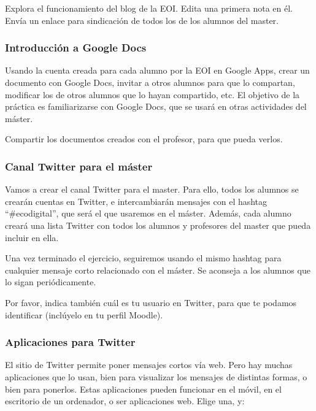 \documentclass[a4paper,12pt]{article}
\begin{document}
Explora el funcionamiento del blog de la EOI. Edita una primera nota en él. Envía un enlace para sindicación de todos los de los alumnos del master.

\subsubsection{Introducción a Google Docs}
\label{sub:googledocs}

Usando la cuenta creada para cada alumno por la EOI en Google Apps, crear un documento con Google Docs, invitar a otros alumnos para que lo compartan, modificar los de otros alumnos que lo hayan compartido, etc. El objetivo de la práctica es familiarizarse con Google Docs, que se usará en otras actividades del máster.

Compartir los documentos creados con el profesor, para que pueda verlos.

\subsubsection{Canal Twitter para el máster}
\label{sub:canaltwitter}

Vamos a crear el canal Twitter para el master. Para ello, todos los alumnos se crearán cuentas en Twitter, e intercambiarán mensajes con el hashtag ``\#ecodigital'', que será el que usaremos en el máster. Además, cada alumno creará una lista Twitter con todos los alumnos y profesores del master que pueda incluir en ella.

Una vez terminado el ejercicio, seguiremos usando el mismo hashtag para cualquier mensaje corto relacionado con el máster. Se aconseja a los alumnos que lo sigan periódicamente.

Por favor, indica también cuál es tu usuario en Twitter, para que te podamos identificar (inclúyelo en tu perfil Moodle).

\subsubsection{Aplicaciones para Twitter}
\label{sub:apptwitter}

El sitio de Twitter permite poner mensajes cortos vía web. Pero hay muchas aplicaciones que lo usan, bien para visualizar los mensajes de distintas formas, o bien para ponerlos. Estas aplicaciones pueden funcionar en el móvil, en el escritorio de un ordenador, o ser aplicaciones web. Elige una, y:
\end{document}
